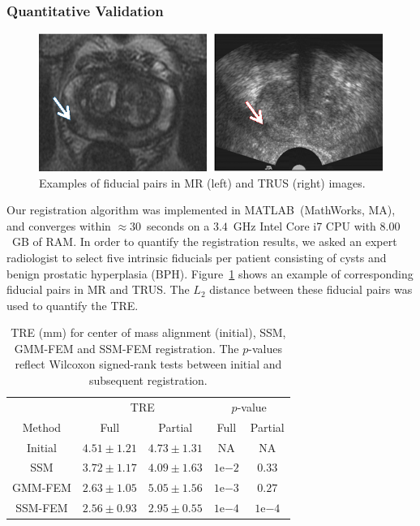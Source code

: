 \documentclass[journal]{IEEEtran}
\newcommand{\eng}[2]{#1\mathrm{e}{#2}}
\begin{document}
\subsubsection{Quantitative Validation}
\begin{figure}[t]
	\centering
	\includegraphics[width=\columnwidth]{images/FiducialPair}
	\caption{Examples of fiducial pairs in MR (left) and TRUS (right) images.}\label{fig:Fiducial}
\end{figure}
Our registration algorithm was implemented in MATLAB\textregistered\ (MathWorks, MA), and converges within $\approx30$~seconds on a $3.4$~GHz Intel Core i7 CPU with $8.00$~GB of RAM. In order to quantify the registration results, we asked an expert radiologist to select five intrinsic fiducials per patient consisting of cysts and benign prostatic hyperplasia (BPH). Figure~\ref{fig:Fiducial} shows an example of corresponding fiducial pairs in MR and TRUS. The $L_2$ distance between these fiducial pairs was used to quantify the TRE.

\begin{table}[t]
\begin{center}
\caption{TRE (mm) for center of mass alignment (initial), SSM, GMM-FEM and SSM-FEM registration. The $p$-values reflect Wilcoxon signed-rank tests between initial and subsequent registration.}
\centering
\begin{tabular}{c| c| c| c| c}
	\hline
	& \multicolumn{2}{c|}{TRE} & \multicolumn{2}{c}{$p$-value}\\
	\cline{2-3}  \cline{4-5}
	Method & Full & Partial & Full & Partial \\
	\hline
	Initial & $4.51 \pm 1.21$ & $4.73 \pm 1.31$ & NA & NA \\
	\hline
	SSM & $3.72 \pm 1.17$ & $4.09 \pm 1.63$ & $\eng{1}{-2}$ & $0.33$ \\
	\hline
	GMM-FEM & $2.63 \pm 1.05$ & $5.05 \pm 1.56$ & $\eng{1}{-3}$ & $0.27$ \\
	\hline
	SSM-FEM & $2.56 \pm 0.93$ & $2.95 \pm 0.55$ & $\eng{1}{-4}$ & $\eng{1}{-4}$ \\
   \hline
\end{tabular}
\label{tab:TRE}
\end{center}
\end{table}
\end{document}
